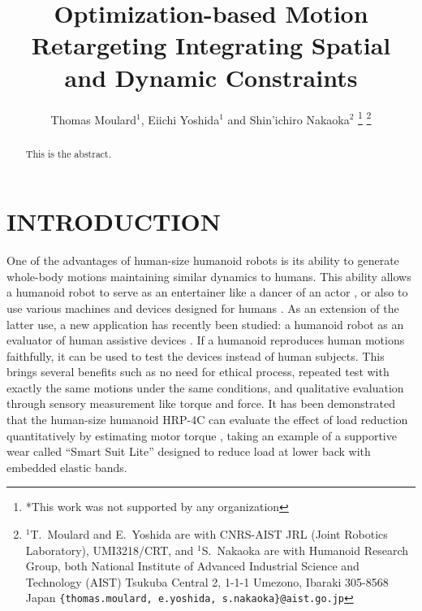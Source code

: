 \documentclass[letterpaper, 10 pt, conference]{ieeeconf}  %
\title{\LARGE \bf
Optimization-based Motion Retargeting Integrating Spatial and Dynamic Constraints
}
\author{Thomas Moulard$^{1}$, Eiichi Yoshida$^{1}$ and Shin'ichiro
  Nakaoka$^{2}$%
\thanks{*This work was not supported by any organization}%
\thanks{$^{1}$T.~Moulard and E.~Yoshida are with CNRS-AIST JRL (Joint
  Robotics Laboratory), UMI3218/CRT, and $^{1}$S.~Nakaoka are with
  Humanoid Research Group, both National Institute of Advanced Industrial Science and Technology (AIST)
Tsukuba Central 2, 1-1-1 Umezono, Ibaraki 305-8568 Japan
        {\tt\footnotesize \{thomas.moulard, e.yoshida, s.nakaoka\}@aist.go.jp}}%
}
\begin{document}
\maketitle
\thispagestyle{empty}
\pagestyle{empty}


\begin{abstract}
This is the abstract.

\end{abstract}


\section{INTRODUCTION}
\label{sec:intro}

One of the advantages of human-size humanoid robots is
its ability to generate whole-body motions maintaining similar
dynamics to humans. 
This ability allows a humanoid robot to serve as an entertainer like
a dancer of an actor \cite{nakaoka_iros2010}, or also to use various
machines and devices designed for humans \cite{Yokoi03iros}.
As an extension of the latter use, a new application
has recently been studied: a humanoid robot as an evaluator of human
assistive devices \cite{Takanishi06ICRA,Miura13ICRA}.
If a humanoid reproduces human motions faithfully, it can be used to
test the devices instead of human subjects. 
This brings several benefits such as no need for ethical 
process, repeated test with exactly the same motions under the same
conditions, and qualitative evaluation through sensory measurement
like torque and force.
It has been demonstrated that the human-size humanoid HRP-4C
\cite{Kaneko09Humanoids}  can evaluate the effect of load reduction
quantitatively by estimating motor torque \cite{Miura13ICRA}, taking
an example of a supportive wear called ``Smart Suit Lite''
\cite{Tanaka11JRM} designed to reduce load 
at lower back with embedded elastic bands. 
\end{document}
